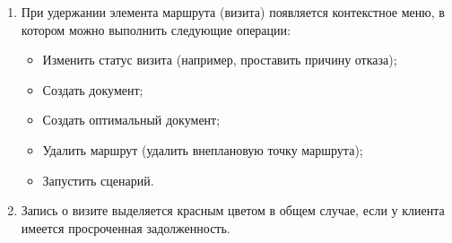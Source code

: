 \begin{enumerate}[\thesection .1]
\item При удержании элемента маршрута (визита) появляется контекстное меню, в котором можно выполнить следующие операции: 
\begin{itemize}
	\item Изменить статус визита (например, проставить причину отказа);
	\item Создать документ;
	\item Создать оптимальный документ;
	\item Удалить маршрут (удалить внеплановую точку маршрута);
	\item Запустить сценарий.
\end{itemize}	
\item Запись о визите выделяется красным цветом в общем случае, если у клиента имеется просроченная задолженность. 
\end{enumerate}